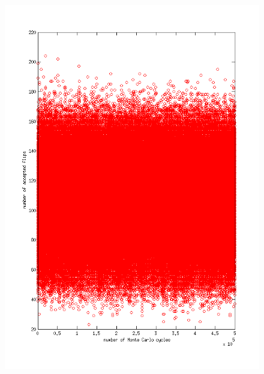 \documentclass[a4paper,english, 10pt, twoside]{article}
\begin{document}
\begin{figure}[H]
 \centering
 \includegraphics[scale = 0.45]{accepted_flips_temp2dot4.png}

\end{figure}
\end{document}
